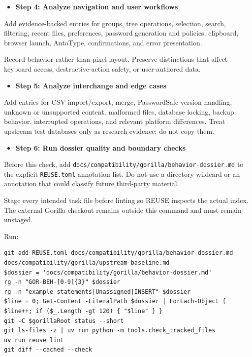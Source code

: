 \documentclass[
  letterpaper,
]{article}
\providecommand{\tightlist}{%
  \setlength{\itemsep}{0pt}\setlength{\parskip}{0pt}}
\begin{document}
\begin{itemize}
\tightlist
\item[$\boxtimes$]
  \textbf{Step 4: Analyze navigation and user workflows}
\end{itemize}

Add evidence-backed entries for groups, tree operations, selection, search, filtering, recent files, preferences,
password generation and policies, clipboard, browser launch, AutoType, confirmations, and error presentation.

Record behavior rather than pixel layout. Preserve distinctions that affect keyboard access, destructive-action safety,
or user-authored data.

\begin{itemize}
\tightlist
\item[$\boxtimes$]
  \textbf{Step 5: Analyze interchange and edge cases}
\end{itemize}

Add entries for CSV import/export, merge, PasswordSafe version handling, unknown or unsupported content, malformed
files, database locking, backup behavior, interrupted operations, and relevant platform differences. Treat upstream test
databases only as research evidence; do not copy them.

\begin{itemize}
\tightlist
\item[$\boxtimes$]
  \textbf{Step 6: Run dossier quality and boundary checks}
\end{itemize}

Before this check, add \nolinkurl{docs/compatibility/gorilla/behavior-dossier.md} to the explicit \nolinkurl{REUSE.toml}
annotation list. Do not use a directory wildcard or an annotation that could classify future third-party material.

Stage every intended task file before linting so REUSE inspects the actual index. The external Gorilla checkout remains
outside this command and must remain unstaged.

Run:

\begin{lstlisting}
git add REUSE.toml docs/compatibility/gorilla/behavior-dossier.md docs/compatibility/gorilla/upstream-baseline.md
$dossier = 'docs/compatibility/gorilla/behavior-dossier.md'
rg -n "GOR-BEH-[0-9]{3}" $dossier
rg -n "example statements|Unassigned|INSERT" $dossier
$line = 0; Get-Content -LiteralPath $dossier | ForEach-Object { $line++; if ($_.Length -gt 120) { "$line" } }
git -C $gorillaRoot status --short
git ls-files -z | uv run python -m tools.check_tracked_files
uv run reuse lint
git diff --cached --check
\end{lstlisting}
\end{document}
